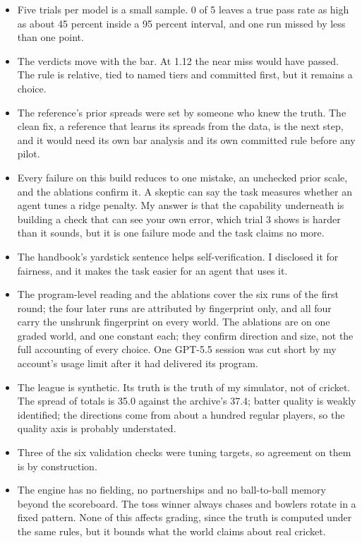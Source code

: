 \documentclass[11pt,letterpaper]{article}
\begin{document}
\begin{itemize}[leftmargin=1.4em, itemsep=2pt]
\item Five trials per model is a small sample. 0 of 5 leaves a true pass rate as high as about 45 percent inside a 95 percent interval, and one run missed by less than one point.
\item The verdicts move with the bar. At 1.12 the near miss would have passed. The rule is relative, tied to named tiers and committed first, but it remains a choice.
\item The reference's prior spreads were set by someone who knew the truth. The clean fix, a reference that learns its spreads from the data, is the next step, and it would need its own bar analysis and its own committed rule before any pilot.
\item Every failure on this build reduces to one mistake, an unchecked prior scale, and the ablations confirm it. A skeptic can say the task measures whether an agent tunes a ridge penalty. My answer is that the capability underneath is building a check that can see your own error, which trial 3 shows is harder than it sounds, but it is one failure mode and the task claims no more.
\item The handbook's yardstick sentence helps self-verification. I disclosed it for fairness, and it makes the task easier for an agent that uses it.
\item The program-level reading and the ablations cover the six runs of the first round; the four later runs are attributed by fingerprint only, and all four carry the unshrunk fingerprint on every world. The ablations are on one graded world, and one constant each; they confirm direction and size, not the full accounting of every choice. One GPT-5.5 session was cut short by my account's usage limit after it had delivered its program.
\item The league is synthetic. Its truth is the truth of my simulator, not of cricket. The spread of totals is 35.0 against the archive's 37.4; batter quality is weakly identified; the directions come from about a hundred regular players, so the quality axis is probably understated.
\item Three of the six validation checks were tuning targets, so agreement on them is by construction.
\item The engine has no fielding, no partnerships and no ball-to-ball memory beyond the scoreboard. The toss winner always chases and bowlers rotate in a fixed pattern. None of this affects grading, since the truth is computed under the same rules, but it bounds what the world claims about real cricket.

\end{itemize}
\end{document}
